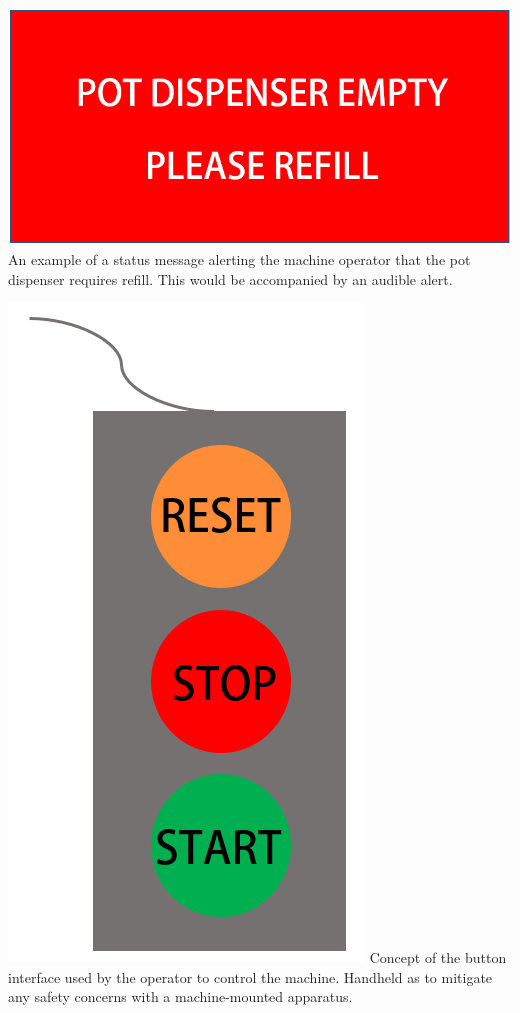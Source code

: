 \documentclass[12pt, titlepage]{article}
\begin{document}
\includegraphics{interface1.png}
\newline
An example of a status message alerting the machine operator that the pot 
dispenser requires refill. This would be accompanied by an audible alert.

\includegraphics{interface2.png}
\newline
Concept of the button interface used by the operator to control the machine. 
Handheld as to mitigate any safety concerns with a machine-mounted apparatus.
\end{document}
